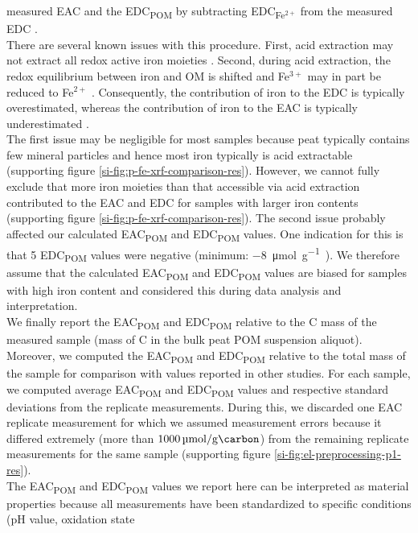 \documentclass[draft,linenumbers]{agujournal2018}
\begin{document}
measured EAC and the EDC\textsubscript{POM} by subtracting
EDC\textsubscript{Fe$^{2+}$} from the measured EDC \citep{Lau.2015}.\\
There are several known issues with this procedure. First, acid
extraction may not extract all redox active iron moieties
\citep{Lau.2016}. Second, during acid extraction, the redox equilibrium
between iron and OM is shifted and Fe\(^{3+}\) may in part be reduced to
Fe\(^{2+}\) \citep{Lau.2015}. Consequently, the contribution of iron to
the EDC is typically overestimated, whereas the contribution of iron to
the EAC is typically underestimated \citep{Lau.2015}.\\
The first issue may be negligible for most samples because peat
typically contains few mineral particles and hence most iron typically
is acid extractable (supporting figure
\ref{si-fig:p-fe-xrf-comparison-res}). However, we cannot fully exclude
that more iron moieties than that accessible via acid extraction
contributed to the EAC and EDC for samples with larger iron contents
(supporting figure \ref{si-fig:p-fe-xrf-comparison-res}). The second
issue probably affected our calculated EAC\textsubscript{POM} and
EDC\textsubscript{POM} values. One indication for this is that 5
EDC\textsubscript{POM} values were negative (minimum:
\SI{-8}{\micro\mol\per\gram\carbon}). We therefore assume that the
calculated EAC\textsubscript{POM} and EDC\textsubscript{POM} values are
biased for samples with high iron content and considered this during
data analysis and interpretation.\\
We finally report the EAC\textsubscript{POM} and EDC\textsubscript{POM}
relative to the C mass of the measured sample (mass of C in the bulk
peat POM suspension aliquot). Moreover, we computed the
EAC\textsubscript{POM} and EDC\textsubscript{POM} relative to the total
mass of the sample for comparison with values reported in other studies.
For each sample, we computed average EAC\textsubscript{POM} and
EDC\textsubscript{POM} values and respective standard deviations from
the replicate measurements. During this, we discarded one EAC replicate
measurement for which we assumed measurement errors because it differed
extremely (more than \(\SI{1000}{\micro\mol\per\gram\carbon}\)) from the
remaining replicate measurements for the same sample (supporting figure
\ref{si-fig:el-preprocessing-p1-res}).\\
The EAC\textsubscript{POM} and EDC\textsubscript{POM} values we report
here can be interpreted as material properties because all measurements
have been standardized to specific conditions (pH value, oxidation state
\end{document}
